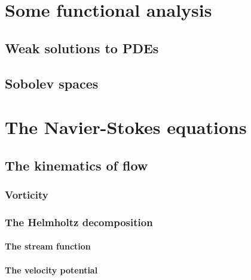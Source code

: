 \documentclass[11pt,a4paper]{memoir}
\begin{document}
\chapter{Some functional analysis}
\section{Weak solutions to PDEs}
\section{Sobolev spaces}

\chapter{The Navier-Stokes equations}

\section{The kinematics of flow}
\subsection{Vorticity}
\subsection{The Helmholtz decomposition}
\subsubsection{The stream function}
\subsubsection{The velocity potential}
\end{document}
